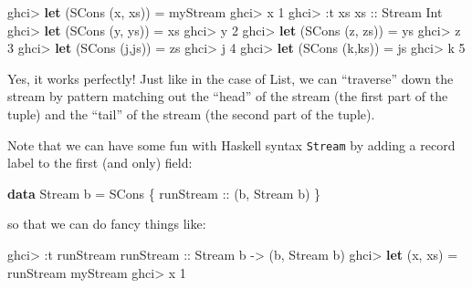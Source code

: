 \documentclass[]{article}
\newenvironment{Shaded}{}{}
\newcommand{\DataTypeTok}[1]{\textcolor[rgb]{0.56,0.13,0.00}{#1}}
\newcommand{\DecValTok}[1]{\textcolor[rgb]{0.25,0.63,0.44}{#1}}
\newcommand{\KeywordTok}[1]{\textcolor[rgb]{0.00,0.44,0.13}{\textbf{#1}}}
\newcommand{\NormalTok}[1]{#1}
\newcommand{\OperatorTok}[1]{\textcolor[rgb]{0.40,0.40,0.40}{#1}}
\newcommand{\OtherTok}[1]{\textcolor[rgb]{0.00,0.44,0.13}{#1}}
\begin{document}
\begin{Shaded}
\begin{Highlighting}[]
\NormalTok{ghci}\OperatorTok{\textgreater{}} \KeywordTok{let}\NormalTok{ (}\DataTypeTok{SCons}\NormalTok{ (x, xs)) }\OtherTok{=}\NormalTok{ myStream}
\NormalTok{ghci}\OperatorTok{\textgreater{}}\NormalTok{ x}
\DecValTok{1}
\NormalTok{ghci}\OperatorTok{\textgreater{}} \OperatorTok{:}\NormalTok{t xs}
\OtherTok{xs ::} \DataTypeTok{Stream} \DataTypeTok{Int}
\NormalTok{ghci}\OperatorTok{\textgreater{}} \KeywordTok{let}\NormalTok{ (}\DataTypeTok{SCons}\NormalTok{ (y, ys)) }\OtherTok{=}\NormalTok{ xs}
\NormalTok{ghci}\OperatorTok{\textgreater{}}\NormalTok{ y}
\DecValTok{2}
\NormalTok{ghci}\OperatorTok{\textgreater{}} \KeywordTok{let}\NormalTok{ (}\DataTypeTok{SCons}\NormalTok{ (z, zs)) }\OtherTok{=}\NormalTok{ ys}
\NormalTok{ghci}\OperatorTok{\textgreater{}}\NormalTok{ z}
\DecValTok{3}
\NormalTok{ghci}\OperatorTok{\textgreater{}} \KeywordTok{let}\NormalTok{ (}\DataTypeTok{SCons}\NormalTok{ (j,js)) }\OtherTok{=}\NormalTok{ zs}
\NormalTok{ghci}\OperatorTok{\textgreater{}}\NormalTok{ j}
\DecValTok{4}
\NormalTok{ghci}\OperatorTok{\textgreater{}} \KeywordTok{let}\NormalTok{ (}\DataTypeTok{SCons}\NormalTok{ (k,ks)) }\OtherTok{=}\NormalTok{ js}
\NormalTok{ghci}\OperatorTok{\textgreater{}}\NormalTok{ k}
\DecValTok{5}
\end{Highlighting}
\end{Shaded}

Yes, it works perfectly! Just like in the case of List, we can ``traverse'' down
the stream by pattern matching out the ``head'' of the stream (the first part of
the tuple) and the ``tail'' of the stream (the second part of the tuple).

Note that we can have some fun with Haskell syntax \texttt{Stream} by adding a
record label to the first (and only) field:

\begin{Shaded}
\begin{Highlighting}[]
\KeywordTok{data} \DataTypeTok{Stream}\NormalTok{ b }\OtherTok{=} \DataTypeTok{SCons}\NormalTok{ \{}\OtherTok{ runStream ::}\NormalTok{ (b, }\DataTypeTok{Stream}\NormalTok{ b) \}}
\end{Highlighting}
\end{Shaded}

so that we can do fancy things like:

\begin{Shaded}
\begin{Highlighting}[]
\NormalTok{ghci}\OperatorTok{\textgreater{}} \OperatorTok{:}\NormalTok{t runStream}
\OtherTok{runStream ::} \DataTypeTok{Stream}\NormalTok{ b }\OtherTok{{-}\textgreater{}}\NormalTok{ (b, }\DataTypeTok{Stream}\NormalTok{ b)}
\NormalTok{ghci}\OperatorTok{\textgreater{}} \KeywordTok{let}\NormalTok{ (x, xs) }\OtherTok{=}\NormalTok{ runStream myStream}
\NormalTok{ghci}\OperatorTok{\textgreater{}}\NormalTok{ x}
\DecValTok{1}
\end{Highlighting}
\end{Shaded}
\end{document}
